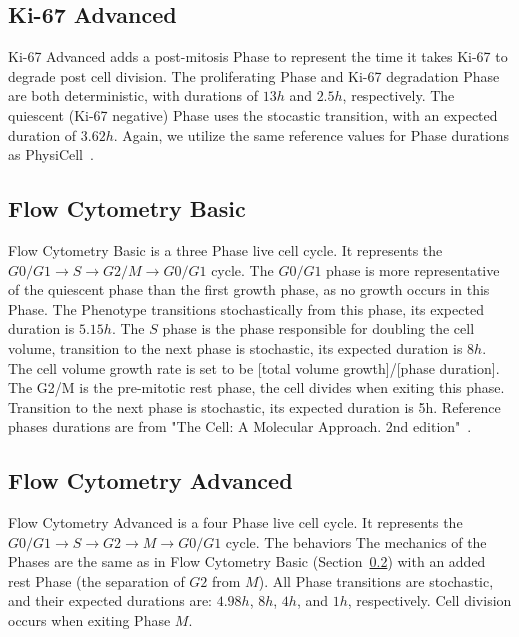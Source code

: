 \subsection{Ki-67 Advanced}\label{sec:predef:ki67-adv}
Ki-67 Advanced adds a post-mitosis Phase to represent the time it takes Ki-67 to degrade post cell division. The proliferating Phase and Ki-67 degradation Phase are both deterministic, with durations of $13h$ and $2.5h$, respectively. The quiescent (Ki-67 negative) Phase uses the stocastic transition, with an expected duration of $3.62h$. Again, we utilize the same reference values for Phase durations as PhysiCell~\cite{ghaffarizadeh_physicell_2018}. 

\subsection{Flow Cytometry Basic}\label{sec:predef:flow-basic}
Flow Cytometry Basic is a three Phase live cell cycle. It represents the $G0/G1 \rightarrow S \rightarrow G2/M \rightarrow G0/G1$ cycle. The $G0/G1$ phase is more representative of the quiescent phase than the first growth phase, as no growth occurs in this Phase. The Phenotype transitions stochastically from this phase, its expected duration is $5.15h$. The $S$ phase is the phase responsible for doubling the cell volume, transition to the next phase is stochastic, its expected duration is $8h$. The cell volume growth rate is set to be [total volume growth]/[phase duration]. The G2/M is the pre-mitotic rest phase, the cell divides when exiting this phase. Transition to the next phase is stochastic, its expected duration is 5h. Reference phases durations are from "The Cell: A Molecular Approach. 2nd edition"~\cite{cooper_eukaryotic_2000}.

\subsection{Flow Cytometry Advanced}\label{sec:predef:flow-adv}
Flow Cytometry Advanced is a four Phase live cell cycle. It represents the $G0/G1 \rightarrow S \rightarrow G2 \rightarrow M \rightarrow G0/G1$ cycle. The behaviors The mechanics of the Phases are the same as in Flow Cytometry Basic (Section~\ref{sec:predef:flow-basic}) with an added rest Phase (the separation of $G2$ from $M$). All Phase transitions are stochastic, and their expected durations are: $4.98h$, $8h$, $4h$, and $1h$, respectively. Cell division occurs when exiting Phase $M$. 

